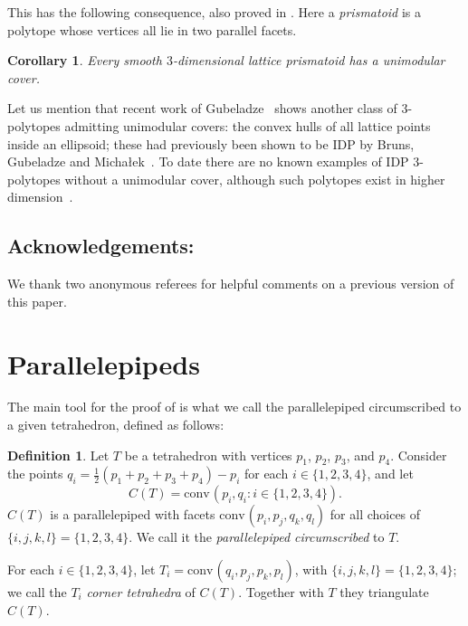 \documentclass{amsart}
\theoremstyle{plain}
\newtheorem{corollary}[theorem]{Corollary}
\theoremstyle{definition}
\newtheorem{definition}[theorem]{Definition}
\newcommand{\conv}{\ensuremath{\mathrm{conv}}\hspace{1pt}}
\begin{document}
This has the following consequence, also proved in .
Here a  \emph{prismatoid} is a polytope whose vertices all lie in two parallel facets. 


\begin{corollary}
\label{coro:prismatoid}
Every smooth $3$-dimensional lattice prismatoid has a unimodular cover.
\end{corollary}

Let us mention that recent work of Gubeladze~\cite{Gubeladze} shows another class of 3-polytopes admitting unimodular covers: the convex hulls of all lattice points inside an ellipsoid; these had previously been shown to be IDP by Bruns, Gubeladze and Micha{\l}ek~\cite{BGM}.
To date there are no known examples of IDP $3$-polytopes without a unimodular cover, although such polytopes exist in higher dimension~\cite{BG}.


\subsection*{Acknowledgements:} We  thank two anonymous referees for helpful comments on a previous version of this paper.


\section{Parallelepipeds}
\label{sec:parallelepipeds}

The main tool for the proof of  is what we call the parallelepiped circumscribed to a given tetrahedron, defined as follows:

\begin{definition}
\label{def:circunpara}
Let $T$ be a tetrahedron with vertices $p_1$, $p_2$, $p_3$, and $p_4$. Consider the points $q_i= \frac12 (p_1+p_2+p_3+p_4) - p_i$ for each $i\in \{1,2,3,4\}$, and let
\[
C(T)=\conv(p_i,q_i: i\in\{1,2,3,4\}).
\] 
$C(T)$ is a parallelepiped with facets $\conv(p_i, p_j, q_k, q_l)$ for all choices of $\{i,j,k,l\}=\{1,2,3,4\}$. We call it the \emph{parallelepiped circumscribed} to $T$.

For each $i \in \{1,2,3,4\}$, let $T_i=\conv(q_i, p_j, p_k, p_l)$, with $\{i,j,k,l\}=\{1,2,3,4\}$; we call the $T_i$ \emph{corner tetrahedra} of $C(T)$. Together with $T$ they triangulate $C(T)$.
\end{definition}
\end{document}
